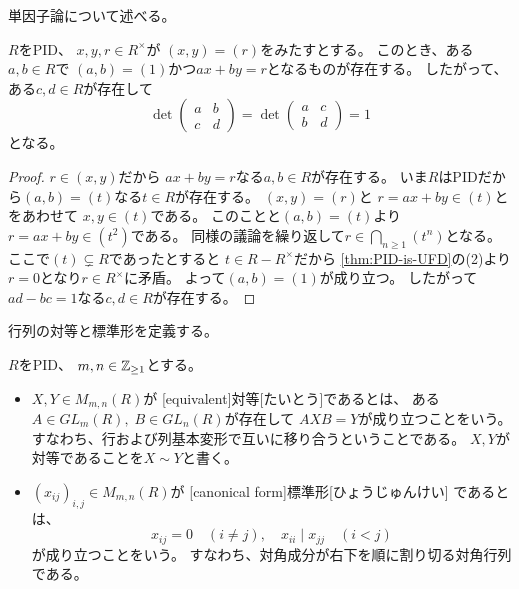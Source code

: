 \documentclass[report]{jlreq}
\begin{document}
単因子論について述べる。

\begin{lemma}
    $R$をPID、
    $x, y, r \in R^\times$が
    $(x, y) = (r)$をみたすとする。
    このとき、ある$a, b \in R$で
    $(a, b) = (1)$かつ$ax + by = r$となるものが存在する。
    したがって、ある$c, d \in R$が存在して
    \begin{equation}
        \det\begin{pmatrix}
            a & b \\
            c & d
        \end{pmatrix}
            = \det\begin{pmatrix}
                a & c \\
                b & d
            \end{pmatrix}
            = 1
    \end{equation}
    となる。
\end{lemma}

\begin{proof}
    $r \in (x, y)$だから
    $ax + by = r$なる$a, b \in R$が存在する。
    いま$R$はPIDだから$(a, b) = (t)$なる$t \in R$が存在する。
    $(x, y) = (r)$と
    $r = ax + by \in (t)$とをあわせて
    $x, y \in (t)$である。
    このことと$(a, b) = (t)$より
    $r = ax + by \in (t^2)$である。
    同様の議論を繰り返して$r \in \bigcap_{n \ge 1} (t^n)$となる。
    ここで$(t) \subsetneq R$であったとすると
    $t \in R - R^\times$だから
    \cref{thm:PID-is-UFD}の(2)より$r = 0$となり$r \in R^\times$に矛盾。
    よって$(a, b) = (1)$が成り立つ。
    したがって$ad - bc = 1$なる$c, d \in R$が存在する。
\end{proof}

行列の対等と標準形を定義する。

\begin{definition}[対等と標準形]
    $R$をPID、
    $m, n \in \mathbb{Z}_{\ge 1}$とする。
    \begin{itemize}
        \item $X, Y \in M_{m, n}(R)$が
            [equivalent]{対等}[たいとう]であるとは、
            ある$A \in GL_m(R), \; B \in GL_n(R)$が存在して
            $AXB = Y$が成り立つことをいう。
            すなわち、行および列基本変形で互いに移り合うということである。
            $X, Y$が対等であることを$X \sim Y$と書く。
        \item $(x_{ij})_{i, j} \in M_{m, n}(R)$が
            [canonical form]{標準形}[ひょうじゅんけい]
            であるとは、
            \begin{equation}
                x_{ij} = 0 \quad (i \neq j),
                \quad
                x_{ii} \mid x_{jj} \quad (i < j)
            \end{equation}
            が成り立つことをいう。
            すなわち、対角成分が右下を順に割り切る対角行列である。
    \end{itemize}
\end{definition}
\end{document}
